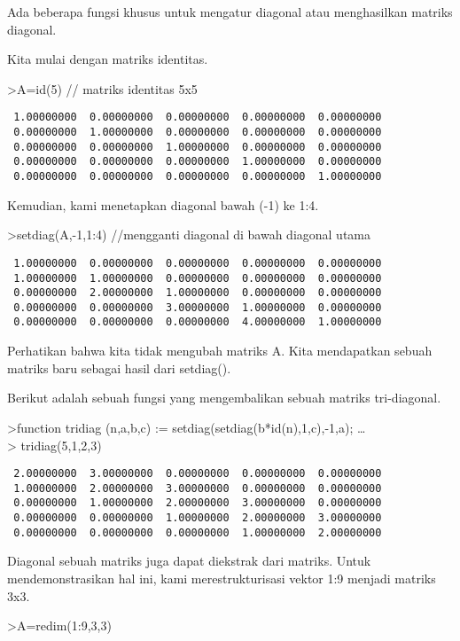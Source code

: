 \documentclass[
]{book}
\begin{document}
Ada beberapa fungsi khusus untuk mengatur diagonal atau menghasilkan matriks diagonal.

Kita mulai dengan matriks identitas.

\textgreater A=id(5) // matriks identitas 5x5

\begin{verbatim}
 1.00000000  0.00000000  0.00000000  0.00000000  0.00000000 
 0.00000000  1.00000000  0.00000000  0.00000000  0.00000000 
 0.00000000  0.00000000  1.00000000  0.00000000  0.00000000 
 0.00000000  0.00000000  0.00000000  1.00000000  0.00000000 
 0.00000000  0.00000000  0.00000000  0.00000000  1.00000000 
\end{verbatim}

Kemudian, kami menetapkan diagonal bawah (-1) ke 1:4.

\textgreater setdiag(A,-1,1:4) //mengganti diagonal di bawah diagonal utama

\begin{verbatim}
 1.00000000  0.00000000  0.00000000  0.00000000  0.00000000 
 1.00000000  1.00000000  0.00000000  0.00000000  0.00000000 
 0.00000000  2.00000000  1.00000000  0.00000000  0.00000000 
 0.00000000  0.00000000  3.00000000  1.00000000  0.00000000 
 0.00000000  0.00000000  0.00000000  4.00000000  1.00000000 
\end{verbatim}

Perhatikan bahwa kita tidak mengubah matriks A. Kita mendapatkan sebuah matriks baru sebagai hasil dari setdiag().

Berikut adalah sebuah fungsi yang mengembalikan sebuah matriks tri-diagonal.

\textgreater function tridiag (n,a,b,c) := setdiag(setdiag(b*id(n),1,c),-1,a); \ldots{}\\
\textgreater{} tridiag(5,1,2,3)

\begin{verbatim}
 2.00000000  3.00000000  0.00000000  0.00000000  0.00000000 
 1.00000000  2.00000000  3.00000000  0.00000000  0.00000000 
 0.00000000  1.00000000  2.00000000  3.00000000  0.00000000 
 0.00000000  0.00000000  1.00000000  2.00000000  3.00000000 
 0.00000000  0.00000000  0.00000000  1.00000000  2.00000000 
\end{verbatim}

Diagonal sebuah matriks juga dapat diekstrak dari matriks. Untuk mendemonstrasikan hal ini, kami merestrukturisasi vektor 1:9 menjadi matriks 3x3.

\textgreater A=redim(1:9,3,3)
\end{document}
